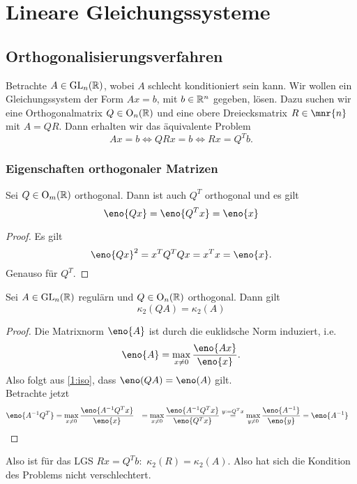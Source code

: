 \chapter{Lineare Gleichungssysteme}
\section{Orthogonalisierungsverfahren}


Betrachte $A\in \operatorname{GL}_{n}(\mathbb{R})$, wobei $A$ schlecht konditioniert sein kann. Wir wollen ein Gleichungssystem der Form $Ax=b$, mit $b\in \mathbb{R}^n$ gegeben, lösen. Dazu suchen wir eine Orthogonalmatrix $Q\in \operatorname{O}_{n}(\mathbb{R})$ und eine obere Dreiecksmatrix $R\in \mnr{n}$ mit $A=QR$. Dann erhalten wir das äquivalente Problem
\[
Ax=b \Longleftrightarrow QRx=b \Longleftrightarrow Rx=Q^T b.
\]

\subsection{Eigenschaften orthogonaler Matrizen}
\begin{lem}\label{1:iso}
	Sei $Q\in \operatorname{O}_{m}(\mathbb{R})$ orthogonal. Dann ist auch $Q^T$ orthogonal und es gilt
	\[
		\eno{Qx}= \eno{Q^Tx}=\eno{x}
	\]
\end{lem}
\begin{proof}
	Es gilt
	\[
	\eno{Qx}^2 = x^TQ^TQx = x^Tx=\eno{x}.
	\]
	Genauso für $Q^T$.
\end{proof}
\begin{lem}
	Sei $A\in \operatorname{GL}_{n}(\mathbb{R})$ regulärn und $Q\in \operatorname{O}_{n}(\mathbb{R})$ orthogonal. Dann gilt
	\[ \kappa_2(QA)=\kappa_2(A)
	\]
\end{lem}
\begin{proof}
	Die Matrixnorm $\eno{A}$ ist durch die euklidsche Norm induziert, i.e.
	\[
	\eno{A} = \max_{x\neq 0} \frac{\eno{Ax}}{\eno{x}}.
	\]
	Also folgt aus \cref{1:iso}, dass $\eno(QA)=\eno(A)$ gilt.\\
	Betrachte jetzt
	\begin{align*}
		\eno{A^{-1}Q^T} &= \max_{x\neq 0}\frac{\eno{A^{-1}Q^Tx}}{\eno{x}}
										&= \max_{x\neq 0}\frac{\eno{A^{-1}Q^Tx}}{\eno{Q^Tx}}
										&\overset{y:=Q^Tx}=  \max_{y\neq 0} \frac{\eno{A^{-1}}}{\eno{y}} = \eno{A^{-1}}
	\end{align*}
\end{proof}
Also ist für das LGS $Rx=Q^Tb:$ $\kappa_2(R)=\kappa_2(A)$. Also hat sich die Kondition des Problems nicht verschlechtert.


